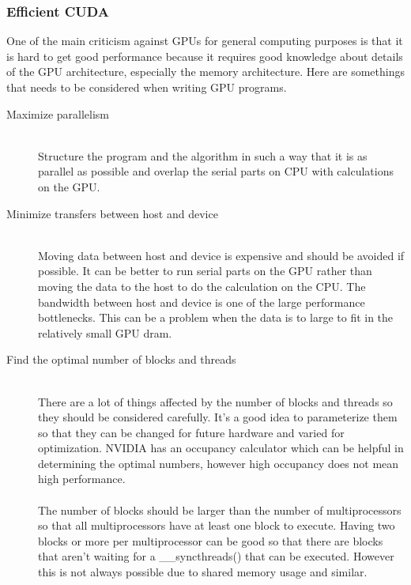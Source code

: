 \documentclass[10pt,a4paper]{report}
\begin{document}
\subsubsection{Efficient CUDA}
One of the main criticism against GPUs for general computing purposes is that it is hard to get good performance because it requires good knowledge about details of the GPU architecture, especially the memory architecture. Here are somethings that needs to be considered when writing GPU programs.\cite{plink_gpu, cuda, cuda_best_practice}
\\
\begin{description}
  \item[Maximize parallelism] \hfill \\
  Structure the program and the algorithm in such a way that it is as parallel as possible and overlap the serial parts on CPU with calculations on the GPU.\cite{plink_gpu, cuda}
  \item[Minimize transfers between host and device] \hfill \\
  Moving data between host and device is expensive and should be avoided if possible. It can be better to run serial parts on the GPU rather than moving the data to the host to do the calculation on the CPU. The bandwidth between host and device is one of the large performance bottlenecks. This can be a problem when the data is to large to fit in the relatively small GPU dram.\cite{cuda, cuda_best_practice}
  \item[Find the optimal number of blocks and threads] \hfill \\
  There are a lot of things affected by the number of blocks and threads so they should be considered carefully. It's a good idea to parameterize them so that they can be changed for future hardware and varied for optimization. NVIDIA has an occupancy calculator which can be helpful in determining the optimal numbers, however high occupancy does not mean high performance.\cite{cuda, cuda_best_practice}\\
  \\
  The number of blocks should be larger than the number of multiprocessors so that all multiprocessors have at least one block to execute. Having two blocks or more per multiprocessor can be good so that there are blocks that aren't waiting for a \_\_syncthreads() that can be executed. However this is not always possible due to shared memory usage and similar.\cite{cuda_best_practice}\\
  \\  

\end{description}
\end{document}
